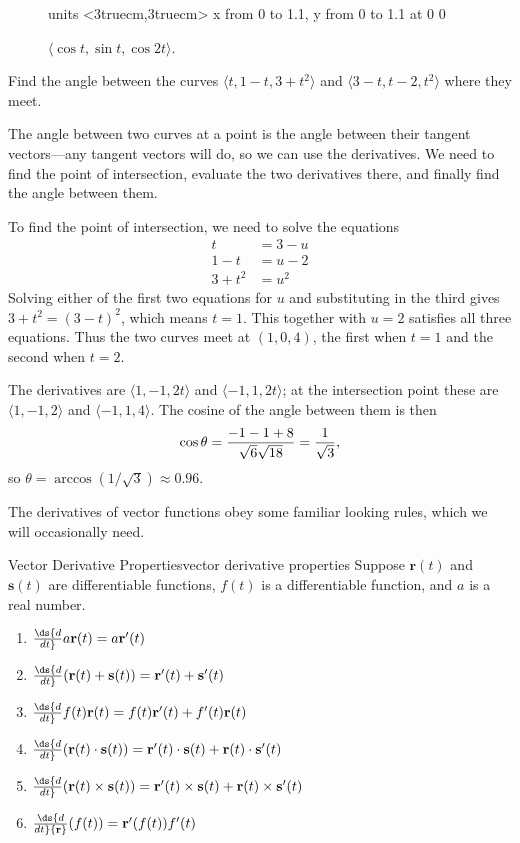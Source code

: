 \begin{figure}[H]
\centerline{
\vbox{\beginpicture
\normalgraphs
\setcoordinatesystem units <3truecm,3truecm>
\setplotarea x from 0 to 1.1, y from 0 to 1.1
 at 0 0
\endpicture}}
\caption{$\langle \cos t,\sin
t,\cos 2t\rangle$. \label{fig:roller coaster}}
\end{figure}

\begin{example}
Find the angle between the curves $\langle t,1-t,3+t^2 \rangle$ and 
$\langle 3-t,t-2,t^2\rangle$ where they meet.
\end{example}
\begin{solution}
The angle between two curves at a point is the angle between their
tangent vectors---any tangent vectors will do, so we can use the
derivatives. We need to find the point of intersection, evaluate the
two derivatives there, and finally find the angle between them.

To find the point of intersection, we need to solve the equations
\begin{align*}
t&=3-u	\\
1-t&=u-2	\\
3+t^2&=u^2
\end{align*}
Solving either of the first two equations for $u$ and substituting in
the third gives $3+t^2=(3-t)^2$, which means $t=1$. This together with
$u=2$ satisfies all three equations. Thus the two curves meet at
$(1,0,4)$, the first when $t=1$ and the second when
$t=2$.

The derivatives are $\langle 1,-1,2t\rangle$ and
$\langle -1,1,2t\rangle$; at the intersection point these are
$\langle 1,-1,2\rangle$ and $\langle -1,1,4\rangle$. The cosine of the
angle between them is then
$$\cos\theta = {-1-1+8\over\sqrt6\sqrt{18}}={1\over\sqrt3},$$
so $\theta=\arccos(1/\sqrt3)\approx0.96$.
\end{solution}

The derivatives of vector functions obey some familiar looking rules,
which we will occasionally need.

\begin{theorem}{Vector Derivative Properties}{vector derivative properties}
Suppose $\bm{ r}(t)$ and ${\bm{s}}(t)$ are differentiable functions,
$f(t)$ is a differentiable function, and $a$ is a real number.
\begin{enumerate}
\item	$\ds {d\over dt} a{\bf r}(t)= a{\bf r}'(t)$
\item	$\ds {d\over dt} ({\bf r}(t)+{\bf s}(t))=
{\bf r}'(t)+{\bf s}'(t)$
\item	$\ds {d\over dt} f(t){\bf r}(t)= f(t){\bf r}'(t)+f'(t){\bf r}(t)$
\item	$\ds {d\over dt} ({\bf r}(t)\cdot{\bf s}(t))=
{\bf r}'(t)\cdot{\bf s}(t)+{\bf r}(t)\cdot{\bf s}'(t)$
\item	$\ds {d\over dt} ({\bf r}(t)\times{\bf s}(t))=
{\bf r}'(t)\times{\bf s}(t)+{\bf r}(t)\times{\bf s}'(t)$
\item	$\ds {d\over dt} {\bf r}(f(t))= {\bf r}'(f(t))f'(t)$
\end{enumerate}
\end{theorem}

